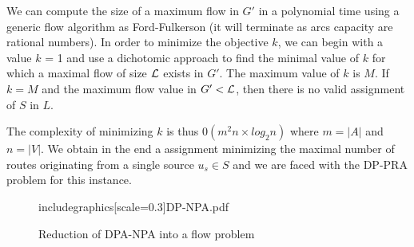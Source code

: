 \documentclass{article}
\newcommand\rmatching{assignment\xspace}
\begin{document}
We can compute the size of a maximum flow in $G'$ in a polynomial time using a generic flow algorithm as Ford-Fulkerson (it will terminate as arcs capacity are rational numbers). In order to minimize the objective $k$, we can begin with a value $k$ = 1 and use a dichotomic approach to find the minimal value of $k$ for which a maximal flow of size $\cal L$ exists in $G'$. The maximum value of $k$ is $M$. If $k = M$ and the maximum flow value in $G' < \cal L$, then there is no valid \rmatching of $S$ in $L$.

The complexity of minimizing $k$ is thus $0(m^2n \times log_2 n)$ where $m = |A|$ and $n=|V|$. We obtain in the end a \rmatching minimizing the maximal number of routes originating from a single source $u_s \in S$ and we are faced with the DP-PRA problem for this instance.


\begin{figure}[!t]
\centering
includegraphics[scale=0.3]{DP-NPA.pdf}
\caption{Reduction of DPA-NPA into a flow problem}
\label{Modelling of DP-NPA Problem}
\end{figure}
\end{document}
